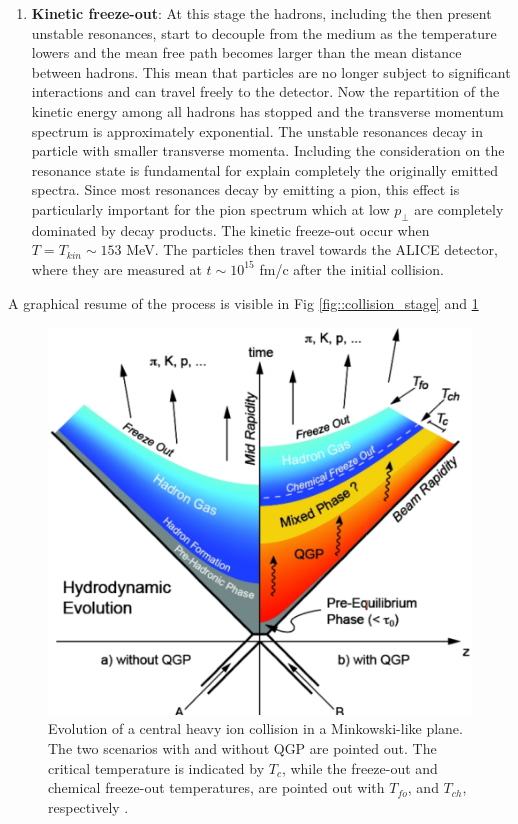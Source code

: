 \documentclass[12pt,a4paper]{book}
\begin{document}
\begin{enumerate}
		\item \textbf{Kinetic freeze-out}: At this stage the hadrons, including the then present unstable resonances, start to decouple from the medium as the temperature lowers and the mean free path becomes larger than the mean distance	between hadrons. This mean that particles are no longer subject to significant interactions and can travel freely to the detector. Now the repartition of the kinetic energy among all hadrons has stopped and the transverse momentum spectrum is approximately exponential. The unstable resonances decay in particle with smaller transverse momenta. Including the consideration on the resonance state is fundamental for explain completely the originally emitted spectra. Since most resonances decay by emitting a pion, this effect is particularly important for the pion spectrum which at low $p_\perp$ are completely dominated by decay products. The kinetic freeze-out occur when $T= T_{kin} \sim 153$ MeV. The particles then travel towards the ALICE detector, where they are measured at $t \sim 10^{15}$ fm/c after the initial collision.
	\end{enumerate}
	A graphical resume of the process is visible in Fig \ref{fig::collision_stage} and \ref{fig:collision_stage_mikowsky}
	\begin{figure}[ht]
		\centering
		\includegraphics[width=0.6\linewidth]{pictures/collision_stage_mikowsky.png}
		\caption{Evolution of a central heavy ion collision in a Minkowski-like plane. The two scenarios with and without QGP are pointed out. The critical temperature is indicated by $T_c$, while the freeze-out and chemical freeze-out temperatures, are pointed out with $T_{fo}$, and $T_{ch}$, respectively \cite{EvolutionofcollisionsandQGP}.}
		\label{fig:collision_stage_mikowsky} 
	\end{figure}
	
\end{document}

